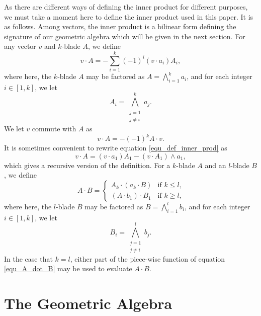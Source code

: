 \documentclass{ecgd-l}
\theoremstyle{definition}
\theoremstyle{remark}
\numberwithin{equation}{section}
\begin{document}
As there are different ways of defining the inner product for different purposes, we must
take a moment here to define the inner product used in this paper.  It is as follows.
Among vectors, the inner product is a bilinear form defining the signature of our geometric algebra
which will be given in the next section.  For any vector $v$ and $k$-blade $A$, we define
\begin{equation}\label{equ_def_inner_prod}
v\cdot A = -\sum_{i=1}^k(-1)^i(v\cdot a_i)A_i,
\end{equation}
where here, the $k$-blade $A$ may be factored as $A=\bigwedge_{i=1}^k a_i$,
and for each integer $i\in[1,k]$, we let
\begin{equation*}
A_i=\bigwedge_{\substack{j=1\\j\neq i}}^k a_j.
\end{equation*}
We let $v$ commute with $A$ as
\begin{equation*}
v\cdot A=-(-1)^kA\cdot v.
\end{equation*}
It is sometimes convenient to rewrite equation \eqref{equ_def_inner_prod} as
\begin{equation*}
v\cdot A = (v\cdot a_1)A_1 - (v\cdot A_1)\wedge a_1,
\end{equation*}
which gives a recursive version of the definition.  For a $k$-blade $A$ and an
$l$-blade $B$, we define
\begin{equation}\label{equ_A_dot_B}
A\cdot B = \left\{\begin{array}{ll}
A_k\cdot (a_k\cdot B) & \mbox{if $k\leq l$,} \\
(A\cdot b_1)\cdot B_1 & \mbox{if $k\geq l$,}
\end{array}\right.
\end{equation}
where here, the $l$-blade $B$ may be factored as $B=\bigwedge_{i=1}^l b_i$, and for each
integer $i\in[1,k]$, we let
\begin{equation*}
B_i=\bigwedge_{\substack{j=1\\j\neq i}}^l b_j.
\end{equation*}
In the case that $k=l$, either part of the piece-wise function of equation \eqref{equ_A_dot_B} may be used to
evaluate $A\cdot B$.

\section{The Geometric Algebra}
\end{document}
